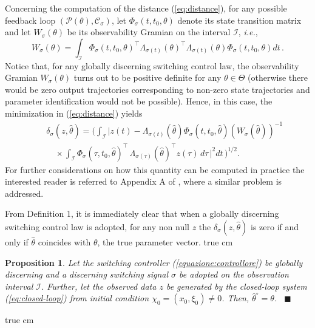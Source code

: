 \documentclass[letterpaper, 10 pt, conference]{ieeetran}
\def\qedp{\hspace*{\fill}~{\tiny $\blacksquare$}}
\def\salt{\vskip 0.2 true cm}
\newtheorem{itproposition}{Proposition}
\newenvironment{proposition}{\begin{itproposition}\rm}{\end{itproposition}}
\begin{document}
Concerning the computation of the distance (\ref{eq:distance}), for any possible feedback loop
$(\mathcal P (\theta), \mathcal C_\sigma)$, let  $\Phi_\sigma(t,t_0,\theta)$ denote its state transition matrix  and let $W_\sigma (\theta)$ be 
its observability Gramian on the interval $\mathcal I$, \emph{i.e.},
\[
W_\sigma (\theta) = \int_{\mathcal I} \Phi_\sigma(t,t_0,\theta)^{\top} \Lambda_{\sigma(t)} (\theta)^\top \Lambda_{\sigma(t)} (\theta) \Phi_\sigma(t,t_0,\theta) dt \, .
\]
Notice that, for any globally discerning switching control law, the observability Gramian 
$W_\sigma (\theta)$ turns out to be
positive definite for any $\theta \in \Theta$ (otherwise there would be zero output trajectories corresponding to non-zero state trajectories and
parameter identification would not be possible). Hence, in this case, 
the minimization in (\ref{eq:distance}) yields
{\setlength\arraycolsep{0pt} 
\begin{eqnarray*}
&& {\delta_{\sigma}(z,{\hat \theta})} = \bigg ( \int_{\mathcal I} \bigg | z(t) - \Lambda_{\sigma(t)} (\hat \theta) \Phi_{\sigma} (t,t_0,\hat \theta) \left ( W_\sigma (\hat \theta)  \right )^{-1} 
\\ && \quad  {} \times \int_{\mathcal I}  \Phi_{\sigma} (\tau,t_0,\hat \theta)
^\top \, \Lambda_{\sigma(\tau)}  (\hat \theta)^\top z(\tau) \, d\tau \,  \bigg |^2 d t \, \bigg )^{1/2}.
\end{eqnarray*}}For further considerations on how this quantity can be computed in practice the interested reader is referred to Appendix A of \cite{BaBaTe13},
where a similar problem is addressed.

From Definition 1, it is immediately clear that when a globally discerning switching control law is adopted, for any non null $z$ the $\delta_\sigma(z,\hat \theta)$ is zero if and only if
$\hat \theta$ coincides with $\theta$, the true parameter vector.\salt

\begin{proposition}\label{prop:least-squares}
Let the switching controller (\ref{equazione:controllore}) be globally discerning and
a discerning switching signal $\sigma$ be adopted on the observation interval $\mathcal I$. Further, let the observed
data $z$ be generated by the closed-loop system (\ref{eq:closed-loop}) from initial condition 
$\chi_0 = (x_0,\xi_0) \ne 0 $. Then, $\hat \theta^\circ = \theta$.
\qedp
\end{proposition}
\salt
\end{document}
